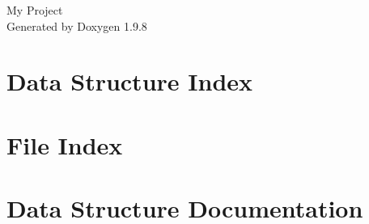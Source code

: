 \documentclass[twoside]{book}
\newcommand{\+}{\discretionary{\mbox{\scriptsize$\hookleftarrow$}}{}{}}
\newcommand{\clearemptydoublepage}{%
    \newpage{\pagestyle{empty}\cleardoublepage}%
  }
\begin{document}
  \raggedbottom
    \hypersetup{pageanchor=false,
                bookmarksnumbered=true,
                pdfencoding=unicode
               }
  \begin{titlepage}
  \vspace*{7cm}
  \begin{center}%
  {\Large My Project}\\
  \vspace*{1cm}
  {\large Generated by Doxygen 1.9.8}\\
  \end{center}
  \end{titlepage}
  \clearemptydoublepage
  \tableofcontents
  \clearemptydoublepage
  \hypersetup{pageanchor=true}
\chapter{Data Structure Index}

\chapter{File Index}

\chapter{Data Structure Documentation}

























\end{document}
